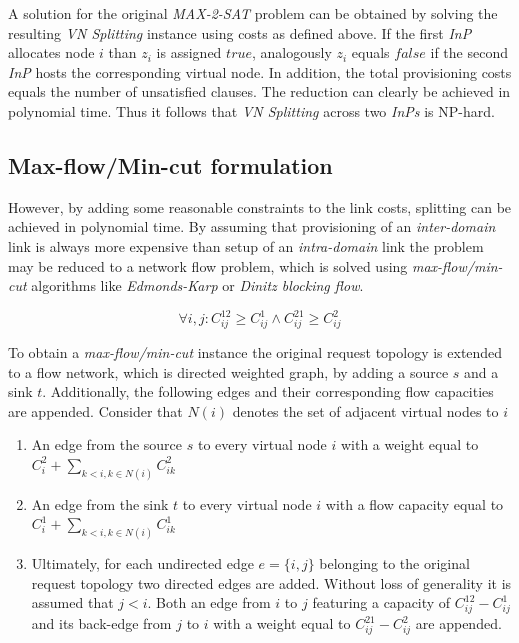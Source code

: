 \documentclass[prodmode,acmtomccap]{acmlarge}
\begin{document}
A solution for the original \emph{MAX-2-SAT} problem can be obtained by solving the resulting \emph{VN Splitting} instance using costs as defined above. If the first \emph{InP} allocates node $i$
than $z_i$ is assigned $true$, analogously $z_i$ equals $false$ if the second \emph{InP} hosts the corresponding virtual node. In addition, the total provisioning costs equals the number of unsatisfied clauses.
The reduction can clearly be achieved in polynomial time. Thus it follows that \emph{VN Splitting} across two \emph{InPs} is NP-hard.

\subsection{Max-flow/Min-cut formulation}
However, by adding some reasonable constraints to the link costs, splitting can be achieved in polynomial time. By assuming that provisioning of an \emph{inter-domain} link is always more expensive
than setup of an \emph{intra-domain} link the problem may be reduced to a network flow problem, which is solved using \emph{max-flow/min-cut} algorithms like \emph{Edmonds-Karp}
or \emph{Dinitz blocking flow}.

$$
	\forall i,j: C_{ij}^{12} \geq C_{ij}^1 \wedge C_{ij}^{21} \geq C_{ij}^2
$$

To obtain a \emph{max-flow/min-cut} instance the original request topology is extended to a flow network, which is directed weighted graph, by adding a source $s$ and a sink $t$.
Additionally, the following edges and their corresponding flow capacities are appended. Consider that $N(i)$ denotes the set of adjacent virtual nodes to $i$

\begin{enumerate}
	\item An edge from the source $s$ to every virtual node $i$ with a weight equal to $C_i^2 + \sum\limits_{k < i, k \in N(i)} C_{ik}^2$
	\item An edge from the sink $t$ to every virtual node $i$ with a flow capacity equal to $C_i^1 + \sum\limits_{k < i, k \in N(i)} C_{ik}^1$
	\item Ultimately, for each undirected edge $e=\{i,j\}$ belonging to the original request topology two directed edges are added. Without loss of generality it is assumed that $j < i$.
		Both an edge from $i$ to $j$ featuring a capacity of $C_{ij}^{12} - C_{ij}^1$ and its back-edge from $j$ to $i$ with a weight equal to $C_{ij}^{21} - C_{ij}^2$ are appended.
\end{enumerate}
\end{document}
